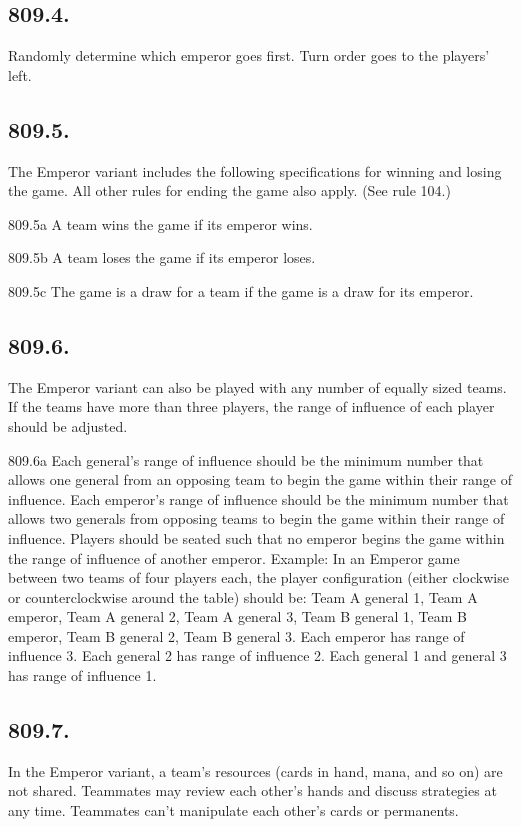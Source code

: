 \subsection*{809.4.}
Randomly determine which emperor goes first. Turn order goes to the players’ left.

\subsection*{809.5.}
The Emperor variant includes the following specifications for winning and losing the game. All other rules for ending the game also apply. (See rule 104.)

809.5a A team wins the game if its emperor wins.

809.5b A team loses the game if its emperor loses.

809.5c The game is a draw for a team if the game is a draw for its emperor.

\subsection*{809.6.}
The Emperor variant can also be played with any number of equally sized teams. If the teams have more than three players, the range of influence of each player should be adjusted.

809.6a Each general’s range of influence should be the minimum number that allows one general from an opposing team to begin the game within their range of influence. Each emperor’s range of influence should be the minimum number that allows two generals from opposing teams to begin the game within their range of influence. Players should be seated such that no emperor begins the game within the range of influence of another emperor.
Example: In an Emperor game between two teams of four players each, the player configuration (either clockwise or counterclockwise around the table) should be: Team A general 1, Team A emperor, Team A general 2, Team A general 3, Team B general 1, Team B emperor, Team B general 2, Team B general 3. Each emperor has range of influence 3. Each general 2 has range of influence 2. Each general 1 and general 3 has range of influence 1.

\subsection*{809.7.}
In the Emperor variant, a team’s resources (cards in hand, mana, and so on) are not shared. Teammates may review each other’s hands and discuss strategies at any time. Teammates can’t manipulate each other’s cards or permanents.

